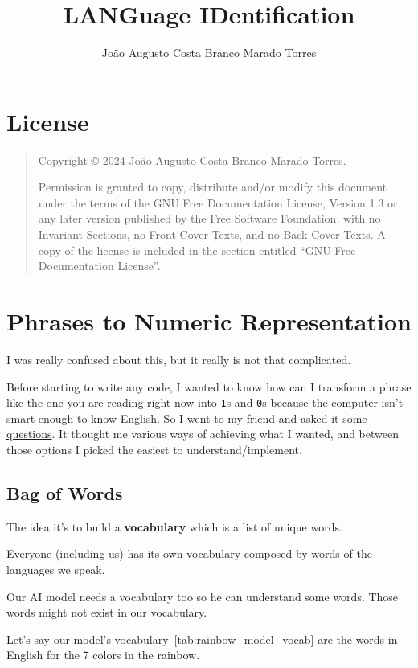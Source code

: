\documentclass[a4paper,12pt]{article}
\title{LANGuage IDentification}
\author{João Augusto Costa Branco Marado Torres}
\newcommand{\copyrightnotice}{
    Copyright \copyright{}  2024  João Augusto Costa Branco Marado Torres.
}
\newcommand{\licensenotice}{
    \copyrightnotice
    Permission is granted to copy, distribute and/or modify this document
    under the terms of the GNU Free Documentation License, Version 1.3
    or any later version published by the Free Software Foundation;
    with no Invariant Sections, no Front-Cover Texts, and no Back-Cover Texts.
    A copy of the license is included in the section entitled ``GNU
    Free Documentation License''.
}
\theoremstyle{mytheoremstyle}
\theoremstyle{mytheoremstyle}
\theoremstyle{myproblemstyle}
\begin{document}
    \maketitle

    \section{License}
    \bigskip
    \begin{quote}
        \licensenotice
    \end{quote}
    \bigskip

    \tableofcontents



    \listoffigures

    \section{Phrases to Numeric Representation}

    I was really confused about this, but it really is not that complicated.

    Before starting to write any code, I wanted to know how can I transform a
    phrase like the one you are reading right now into \texttt{1}s and
    \texttt{0}s because the computer isn't smart enough to know English.
    So I went to my friend and
    \href{https://chatgpt.com/share/675976d6-b2c8-8002-964c-a3fff698bcc0}{asked
    it some questions}.
    It thought me various ways of achieving what I wanted, and between those
    options I picked the easiest to understand/implement.

    \subsection{Bag of Words}

    The idea it's to build a \textbf{vocabulary} which is a list of unique
    words.

    Everyone (including us) has its own vocabulary composed by words of the
    languages we speak.

    Our AI model needs a vocabulary too so he can understand some words. Those
    words might not exist in our vocabulary.

    Let's say {our model's vocabulary}~\ref{tab:rainbow_model_vocab} are
    the words in English for the 7 colors in the rainbow.
\end{document}
